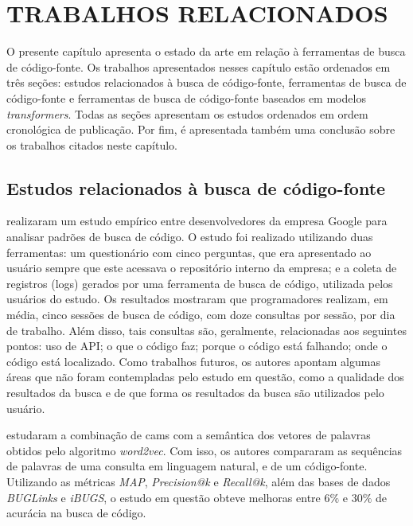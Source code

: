 \chapter{TRABALHOS RELACIONADOS}
\label{chp:relatedWorks}

O presente capítulo apresenta o estado da arte em relação à ferramentas de busca de código-fonte. Os trabalhos apresentados nesses capítulo estão ordenados em três seções: estudos relacionados à busca de código-fonte, ferramentas de busca de código-fonte e ferramentas de busca de código-fonte baseados em modelos \textit{transformers}. Todas as seções apresentam os estudos ordenados em ordem cronológica de publicação. Por fim, é apresentada também uma conclusão sobre os trabalhos citados neste capítulo.

\section{Estudos relacionados à busca de código-fonte}
\textcite{Sadowski2015HowDS} realizaram um estudo empírico entre desenvolvedores da empresa Google para analisar padrões de busca de código. O estudo foi realizado utilizando duas ferramentas: um questionário com cinco perguntas, que era apresentado ao usuário sempre que este acessava o repositório interno da empresa; e a coleta de registros (logs) gerados por uma ferramenta de busca de código, utilizada pelos usuários do estudo. Os resultados mostraram que programadores realizam, em média, cinco sessões de busca de código, com doze consultas por sessão, por dia de trabalho. Além disso, tais consultas são, geralmente, relacionadas aos seguintes pontos: uso de API; o que o código faz; porque o código está falhando; onde o código está localizado. Como trabalhos futuros, os autores apontam algumas áreas que não foram contempladas pelo estudo em questão, como a qualidade dos resultados da busca e de que forma os resultados da busca são utilizados pelo usuário. 

\textcite{Akbar2019SCORSC} estudaram a combinação de \glspl{cam} com a semântica dos vetores de palavras obtidos pelo algoritmo \textit{word2vec}. Com isso, os autores compararam as sequências de palavras de uma consulta em linguagem natural, e de um código-fonte. Utilizando as métricas \textit{MAP}, \textit{Precision@k} e \textit{Recall@k}, além das bases de dados \textit{BUGLinks} e \textit{iBUGS}, o estudo em questão obteve melhoras entre $6\%$ e $30\%$ de acurácia na busca de código.

